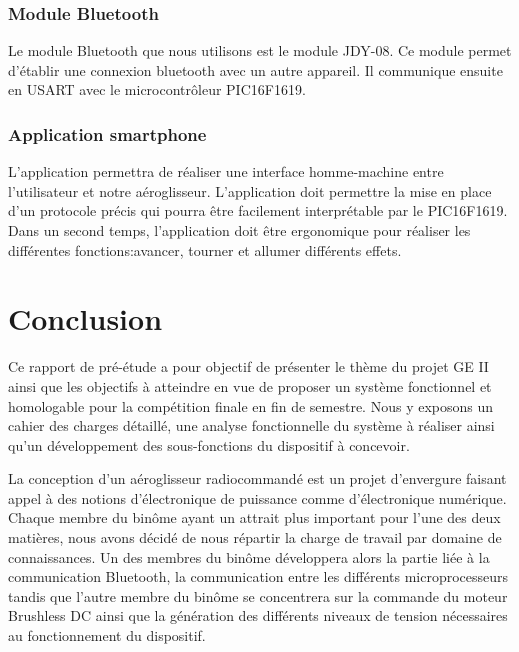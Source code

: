 \documentclass[a4paper,12pt]{report}
\begin{document}
			\vspace{-1em}
			
			\subsubsection{Module Bluetooth}
			
			\vspace{-1em}
			
			Le module Bluetooth que nous utilisons est le module JDY-08. Ce module permet d'établir une connexion bluetooth avec un autre appareil. Il communique ensuite en USART avec le microcontrôleur PIC16F1619.
			
			\vspace{-1em}
			
			\subsubsection{Application smartphone}
			\vspace{-1em}			
			L'application permettra de réaliser une interface homme-machine entre l'utilisateur et notre aéroglisseur. L'application doit permettre la mise en place d'un protocole précis qui pourra être facilement interprétable par le PIC16F1619. Dans un second temps, l'application doit être ergonomique pour réaliser les différentes fonctions:avancer, tourner et allumer différents effets.
	
	\section{Conclusion}
	
	\vspace{-1em}
	
	Ce rapport de pré-étude a pour objectif de présenter le thème du projet GE II ainsi que les objectifs à atteindre en vue de proposer un système fonctionnel et homologable pour la compétition finale en fin de semestre. Nous y exposons un cahier des charges détaillé, une analyse fonctionnelle du système à réaliser ainsi qu'un développement des sous-fonctions du dispositif à concevoir.
	
	La conception d'un aéroglisseur radiocommandé est un projet d'envergure faisant appel à des notions d'électronique de puissance comme d'électronique numérique. Chaque membre du binôme ayant un attrait plus important pour l'une des deux matières, nous avons décidé de nous répartir la charge de travail par domaine de connaissances. Un des membres du binôme développera alors la partie liée à la communication Bluetooth, la communication entre les différents microprocesseurs tandis que l'autre membre du binôme se concentrera sur la commande du moteur Brushless DC ainsi que la génération des différents niveaux de tension nécessaires au fonctionnement du dispositif.
	
\end{document}

